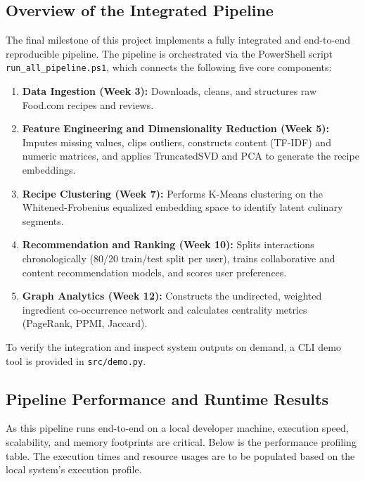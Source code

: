 \documentclass[11pt,a4paper]{article}
\begin{document}
\subsection{Overview of the Integrated Pipeline}
The final milestone of this project implements a fully integrated and end-to-end reproducible pipeline. The pipeline is orchestrated via the PowerShell script \texttt{run\_all\_pipeline.ps1}, which connects the following five core components:
\begin{enumerate}
    \item \textbf{Data Ingestion (Week 3):} Downloads, cleans, and structures raw Food.com recipes and reviews.
    \item \textbf{Feature Engineering and Dimensionality Reduction (Week 5):} Imputes missing values, clips outliers, constructs content (TF-IDF) and numeric matrices, and applies TruncatedSVD and PCA to generate the recipe embeddings.
    \item \textbf{Recipe Clustering (Week 7):} Performs K-Means clustering on the Whitened-Frobenius equalized embedding space to identify latent culinary segments.
    \item \textbf{Recommendation and Ranking (Week 10):} Splits interactions chronologically (80/20 train/test split per user), trains collaborative and content recommendation models, and scores user preferences.
    \item \textbf{Graph Analytics (Week 12):} Constructs the undirected, weighted ingredient co-occurrence network and calculates centrality metrics (PageRank, PPMI, Jaccard).
\end{enumerate}

To verify the integration and inspect system outputs on demand, a CLI demo tool is provided in \texttt{src/demo.py}.

\subsection{Pipeline Performance and Runtime Results}
As this pipeline runs end-to-end on a local developer machine, execution speed, scalability, and memory footprints are critical. Below is the performance profiling table. The execution times and resource usages are to be populated based on the local system's execution profile.
\end{document}
